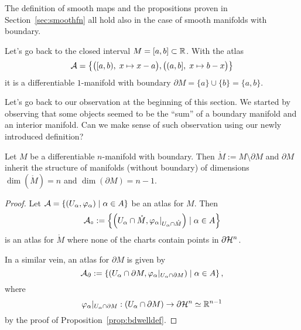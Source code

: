 \begin{remark}
  The definition of smooth maps and the propositions proven in Section~\ref{sec:smoothfn} all hold also in the case of smooth manifolds with boundary.
\end{remark}

\begin{example}\label{ex:mfldbdryinterval}
  Let's go back to the closed interval $M=[a,b]\subset\mathbb{R}$.
  With the atlas
  \begin{equation}
    \mathcal{A}=\big\{
    \big([a,b), \; x\mapsto x-a\big),
    \big((a,b], \; x\mapsto b-x\big)
    \big\}
  \end{equation}
  it is a differentiable $1$-manifold with boundary $\partial M = \{a\} \cup \{b\} = \{a, b\}$.
\end{example}

Let's go back to our observation at the beginning of this section.
We started by observing that some objects seemed to be the ``sum'' of a boundary manifold and an interior manifold.
Can we make sense of such observation using our newly introduced definition?

\begin{proposition}
  Let $M$ be a differentiable $n$-manifold with boundary.
  Then $\mathring M := M\setminus\partial M$ and $\partial M$ inherit the structure of manifolds (without boundary) of dimensions $\dim(\mathring M)=n$ and $\dim(\partial M) = n-1$.
\end{proposition}
\begin{proof}
  Let $\mathcal{A} = \{(U_\alpha,\varphi_\alpha) \mid \alpha\in A\}$ be an atlas for $M$.
  Then
  \begin{equation}
    \mathcal{A}_\circ := \left\{
    \left(
    U_\alpha \cap \mathring M,
    \varphi_\alpha|_{U_\alpha \cap \mathring M}
    \right) \mid \alpha\in A
    \right\}
  \end{equation}
  is an atlas for $\mathring M$ where none of the charts contain points in $\partial\mathcal{H}^n$.

  In a similar vein, an atlas for $\partial M$ is given by
  \begin{equation}
    \mathcal{A}_\partial := \left\{
    \left(
    U_\alpha \cap \partial M,
    \varphi_\alpha|_{U_\alpha \cap \partial M}
    \right) \mid \alpha\in A
    \right\},
  \end{equation}
  where
  \begin{equation}
    \varphi_\alpha|_{U_\alpha \cap \partial M} : (U_\alpha \cap \partial M) \to \partial\mathcal{H}^n\simeq\mathbb{R}^{n-1}
  \end{equation}
  by the proof of Proposition~\ref{prop:bdwelldef}.
\end{proof}

